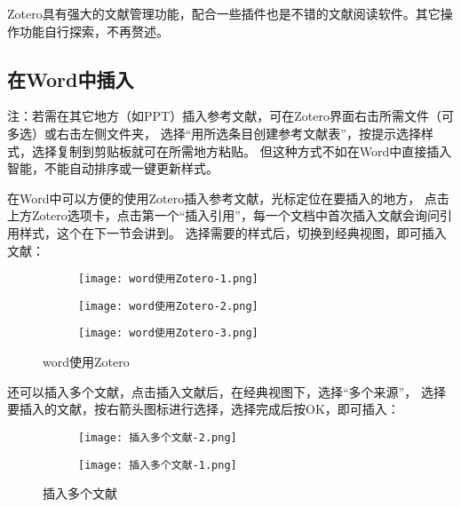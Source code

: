 Zotero具有强大的文献管理功能，配合一些插件也是不错的文献阅读软件。其它操作功能自行探索，不再赘述。

\newpage

\subsection{在Word中插入}
注：若需在其它地方（如PPT）插入参考文献，可在Zotero界面右击所需文件（可多选）或右击左侧文件夹，
选择“用所选条目创建参考文献表”，按提示选择样式，选择复制到剪贴板就可在所需地方粘贴。
但这种方式不如在Word中直接插入智能，不能自动排序或一键更新样式。

在Word中可以方便的使用Zotero插入参考文献，光标定位在要插入的地方，
点击上方Zotero选项卡，点击第一个“插入引用”，每一个文档中首次插入文献会询问引用样式，这个在下一节会讲到。
选择需要的样式后，切换到经典视图，即可插入文献：

\begin{figure}[h]
    \centering
    \begin{subfigure}[c]{0.48\textwidth}
      \texttt{[image: word使用Zotero-1.png]}
      \label{Zotero 4-1}
    \end{subfigure}
    \hfill
    \begin{subfigure}[c]{0.48\textwidth}
      \texttt{[image: word使用Zotero-2.png]}
      \label{Zotero 4-2}
    \end{subfigure}
    \hspace{-1em}
    \begin{subfigure}[c]{0.8\textwidth}
        \texttt{[image: word使用Zotero-3.png]}
        \label{Zotero 4-3}
    \end{subfigure}
    \caption{word使用Zotero}
    \label{Zotero 4}
\end{figure}

还可以插入多个文献，点击插入文献后，在经典视图下，选择“多个来源”，
选择要插入的文献，按右箭头图标进行选择，选择完成后按OK，即可插入：

\newpage

\begin{figure}[h]
    \centering
    \begin{subfigure}[c]{0.48\textwidth}
      \texttt{[image: 插入多个文献-2.png]}
      \label{Zotero 5-1}
    \end{subfigure}
    \hfill
    \begin{subfigure}[c]{0.48\textwidth}
      \texttt{[image: 插入多个文献-1.png]}
      \label{Zotero 5-2}
    \end{subfigure}
    \caption{插入多个文献}
    \label{Zotero 5}
\end{figure}

